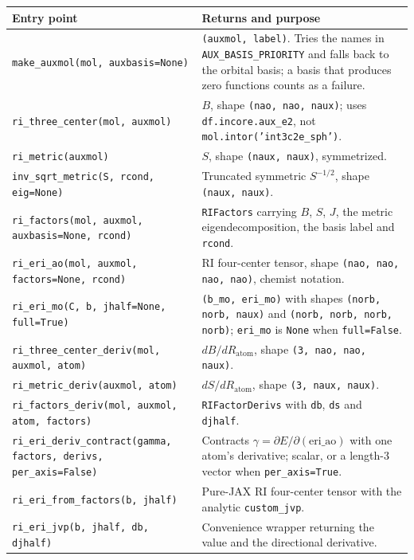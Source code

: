 \begin{center}
\small
\begin{tabularx}{\textwidth}{>{\raggedright\arraybackslash}p{}>{\raggedright\arraybackslash}X}
\toprule
Entry point & Returns and purpose \\
\midrule
\texttt{make\_auxmol(mol, auxbasis=None)} &
  \texttt{(auxmol, label)}.  Tries the names in
  \texttt{AUX\_BASIS\_PRIORITY} and falls back to the orbital basis;
  a basis that produces zero functions counts as a failure. \\
\texttt{ri\_three\_center(mol, auxmol)} &
  $B$, shape \texttt{(nao, nao, naux)}; uses
  \texttt{df.incore.aux\_e2}, not \texttt{mol.intor('int3c2e\_sph')}. \\
\texttt{ri\_metric(auxmol)} &
  $S$, shape \texttt{(naux, naux)}, symmetrized. \\
\texttt{inv\_sqrt\_metric(S, rcond, eig=None)} &
  Truncated symmetric $S^{-1/2}$, shape \texttt{(naux, naux)}. \\
\texttt{ri\_factors(mol, auxmol, auxbasis=None, rcond)} &
  \texttt{RIFactors} carrying $B$, $S$, $J$, the metric
  eigendecomposition, the basis label and \texttt{rcond}. \\
\texttt{ri\_eri\_ao(mol, auxmol, factors=None, rcond)} &
  RI four-center tensor, shape \texttt{(nao, nao, nao, nao)}, chemist
  notation. \\
\texttt{ri\_eri\_mo(C, b, jhalf=None, full=True)} &
  \texttt{(b\_mo, eri\_mo)} with shapes
  \texttt{(norb, norb, naux)} and \texttt{(norb, norb, norb, norb)};
  \texttt{eri\_mo} is \texttt{None} when \texttt{full=False}. \\
\texttt{ri\_three\_center\_deriv(mol, auxmol, atom)} &
  $dB/dR_{\mathrm{atom}}$, shape \texttt{(3, nao, nao, naux)}. \\
\texttt{ri\_metric\_deriv(auxmol, atom)} &
  $dS/dR_{\mathrm{atom}}$, shape \texttt{(3, naux, naux)}. \\
\texttt{ri\_factors\_deriv(mol, auxmol, atom, factors)} &
  \texttt{RIFactorDerivs} with \texttt{db}, \texttt{ds} and
  \texttt{djhalf}. \\
\texttt{ri\_eri\_deriv\_contract(gamma, factors, derivs, per\_axis=False)} &
  Contracts $\gamma = \partial E/\partial(\text{eri\_ao})$ with one
  atom's derivative; scalar, or a length-3 vector when
  \texttt{per\_axis=True}. \\
\texttt{ri\_eri\_from\_factors(b, jhalf)} &
  Pure-JAX RI four-center tensor with the analytic \texttt{custom\_jvp}. \\
\texttt{ri\_eri\_jvp(b, jhalf, db, djhalf)} &
  Convenience wrapper returning the value and the directional
  derivative. \\
\bottomrule
\end{tabularx}
\end{center}

